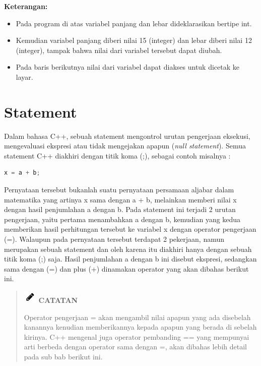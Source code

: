 \textbf{Keterangan:}

\begin{itemize}

\item
  Pada program di atas variabel panjang dan lebar dideklarasikan bertipe
  int.
\item
  Kemudian variabel panjang diberi nilai 15 (integer) dan lebar diberi
  nilai 12 (integer), tampak bahwa nilai dari variabel tersebut dapat
  diubah.
\item
  Pada baris berikutnya nilai dari variabel dapat diakses untuk dicetak
  ke layar.
\end{itemize}

\section{Statement}\label{statement}

Dalam bahasa C++, sebuah statement mengontrol urutan pengerjaan
eksekusi, mengevaluasi ekspresi atau tidak mengejakan apapun (\emph{null
statement}). Semua statement C++ diakhiri dengan titik koma (;), sebagai
contoh misalnya :

\begin{lstlisting}[language=c++, numbers=none]
x = a + b;
\end{lstlisting}

Pernyataan tersebut bukanlah suatu pernyataan persamaan aljabar dalam
matematika yang artinya x sama dengan a + b, melainkan memberi nilai x
dengan hasil penjumlahan a dengan b. Pada statement ini terjadi 2 urutan
pengerjaan, yaitu pertama menambahkan a dengan b, kemudian yang kedua
memberikan hasil perhitungan tersebut ke variabel x dengan operator
pengerjaan (=). Walaupun pada pernyataan tersebut terdapat 2 pekerjaan,
namun merupakan sebuah statement dan oleh karena itu diakhiri hanya
dengan sebuah titik koma (;) saja. Hasil penjumlahan a dengan b ini
disebut ekspresi, sedangkan sama dengan (=) dan plus (+) dinamakan
operator yang akan dibahas berikut ini.

\begin{quotation}
\includegraphics{../manuscript/images/pencil.png} \textbf{CATATAN}
 
 Operator pengerjaan = akan mengambil nilai apapun yang ada disebelah
 kanannya kenudian memberikannya kepada apapun yang berada di sebelah
 kirinya. C++ mengenal juga operator pembanding == yang mempunyai
 arti berbeda dengan operator sama dengan =, akan dibahas lebih
 detail pada sub bab berikut ini.
\end{quotation}


